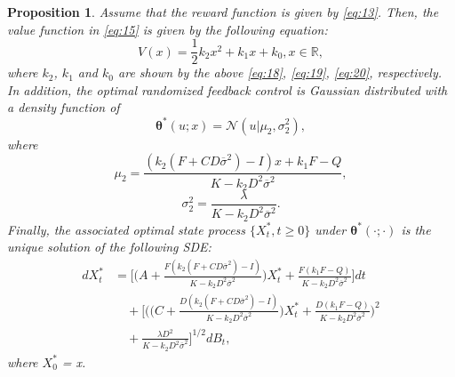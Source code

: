 \documentclass[onecolumn, journal]{IEEEtran} %
\newtheorem{proposition}{Proposition}
\begin{document}
	\begin{proposition}
		Assume that the reward function is given by \eqref{eq:13}.
		Then, the value function in \eqref{eq:15} is given by the following equation:
		\[
		V(x) = \frac{1}{2} k_2 x^2 + k_1 x + k_0, x \in \mathbb{R},
		\]
		where $k_2$, $k_1$ and $k_0$ are shown by the above \eqref{eq:18}, \eqref{eq:19}, \eqref{eq:20}, respectively. In addition, the optimal randomized feedback control is Gaussian distributed with a density function of
		\begin{equation}\label{eq:21}
			\boldsymbol{\theta}^*(u;x) = \mathcal{N} \left( u \big|\mu_2, \sigma_2^2 \right), \tag{21}
		\end{equation}
		where
		\[
		\mu_2 = \frac{(k_2(F + CD\overline{\sigma}^2) - I)x + k_1F - Q}{K - k_2D^2\overline{\sigma}^2},\]
		\[\sigma_2^2 = \frac{\lambda}{K - k_2D^2\overline{\sigma}^2}.
		\]
		Finally, the associated optimal state process $\{X_t^*, t \geq 0\}$ under $\boldsymbol{\theta}^*(\cdot; \cdot)$ is the unique solution
		of the following SDE:
		\begin{equation*}
			\begin{aligned}
				dX_t^* &= \bigg[ \Big( A + \tfrac{F(k_2(F + CD\overline{\sigma}^2) - I)}{K - k_2D^2\overline{\sigma}^2} \Big) X_t^* + \tfrac{F(k_1F - Q)}{K - k_2D^2\overline{\sigma}^2} \bigg] dt \\
				&\quad+ \bigg[ \Big( \big( C + \tfrac{D(k_2(F + CD\overline{\sigma}^2) - I)}{K - k_2D^2\overline{\sigma}^2} \big) X_t^* + \tfrac{D(k_1F - Q)}{K - k_2D^2\overline{\sigma}^2} \Big)^2 \\
				&\quad+ \tfrac{\lambda D^2}{K - k_2D^2\overline{\sigma}^2} \bigg]^{1/2} dB_t,
			\end{aligned}
		\end{equation*}
		where $X_0^*$ = x.
	\end{proposition}
	
\end{document}
